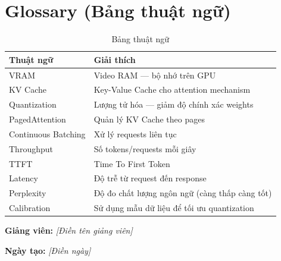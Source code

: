 \documentclass[12pt,a4paper]{report}
\begin{document}
\chapter{Glossary (Bảng thuật ngữ)}

\begin{table}[h]
\centering
\caption{Bảng thuật ngữ}
\label{tab:glossary}
\begin{tabular}{lp{10cm}}
\toprule
\textbf{Thuật ngữ} & \textbf{Giải thích} \\
\midrule
VRAM & Video RAM --- bộ nhớ trên GPU \\
KV Cache & Key-Value Cache cho attention mechanism \\
Quantization & Lượng tử hóa --- giảm độ chính xác weights \\
PagedAttention & Quản lý KV Cache theo pages \\
Continuous Batching & Xử lý requests liên tục \\
Throughput & Số tokens/requests mỗi giây \\
TTFT & Time To First Token \\
Latency & Độ trễ từ request đến response \\
Perplexity & Độ đo chất lượng ngôn ngữ (càng thấp càng tốt) \\
Calibration & Sử dụng mẫu dữ liệu để tối ưu quantization \\
\bottomrule
\end{tabular}
\end{table}

\vfill

\begin{center}

\vspace{0.5cm}
{\large\textbf{Giảng viên:} \textit{[Điền tên giảng viên]}\par}
{\large\textbf{Ngày tạo:} \textit{[Điền ngày]}\par}
\end{center}
\end{document}
